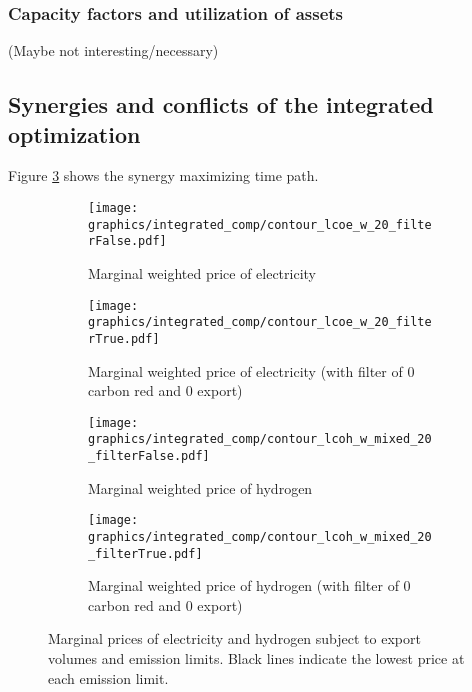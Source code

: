 \subsubsection{Capacity factors and utilization of assets}
(Maybe not interesting/necessary)



\subsection{Synergies and conflicts of the integrated optimization}
\label{subsec: syn_conf_integrated}
Figure \ref{fig:contour_plot} shows the synergy maximizing time path.


\begin{figure*}[t] %
    \centering
    \begin{subfigure}[b]{0.45\linewidth}
        \centering
        \texttt{[image: graphics/integrated\_comp/contour\_lcoe\_w\_20\_filterFalse.pdf]}
        \caption{Marginal weighted price of electricity}
        \label{fig:contour_plot}
    \end{subfigure}
    \hfill
    \begin{subfigure}[b]{0.45\linewidth}
        \centering
        \texttt{[image: graphics/integrated\_comp/contour\_lcoe\_w\_20\_filterTrue.pdf]}
        \caption{Marginal weighted price of electricity (with filter of 0 carbon red and 0 export)}
        \label{fig:contour_plot}
    \end{subfigure}
    \hfill
    \begin{subfigure}[b]{0.45\linewidth}
        \centering
        \texttt{[image: graphics/integrated\_comp/contour\_lcoh\_w\_mixed\_20\_filterFalse.pdf]}
        \caption{Marginal weighted price of hydrogen}
        \label{fig:contour_plot}
    \end{subfigure}
    \hfill
    \begin{subfigure}[b]{0.45\linewidth}
        \centering
        \texttt{[image: graphics/integrated\_comp/contour\_lcoh\_w\_mixed\_20\_filterTrue.pdf]}
        \caption{Marginal weighted price of hydrogen (with filter of 0 carbon red and 0 export)}
        \label{fig:contour_plot_totalsystem}
    \end{subfigure}
    \hfill

    \caption{Marginal prices of electricity and hydrogen subject to export volumes and emission limits. Black lines indicate the lowest price at each emission limit.}
    \label{fig:comparison}
\end{figure*}



